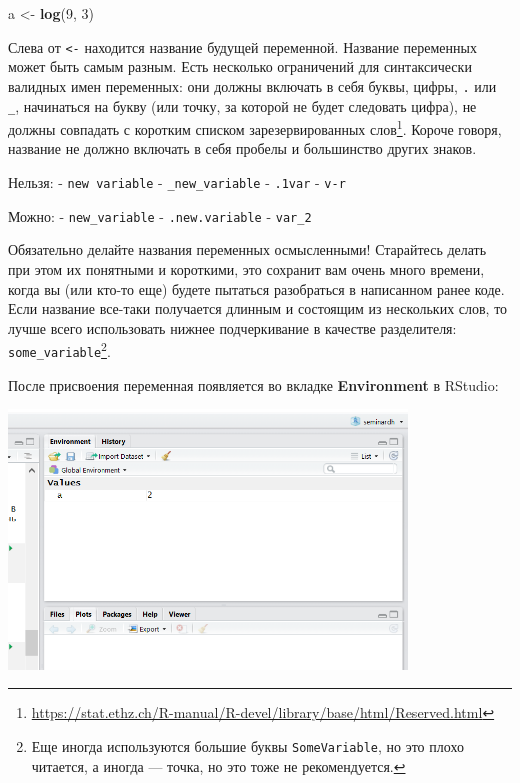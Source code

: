 \documentclass[
]{book}
\newenvironment{Shaded}{\begin{snugshade}}{\end{snugshade}}
\newcommand{\DecValTok}[1]{\textcolor[rgb]{0.00,0.00,0.81}{#1}}
\newcommand{\KeywordTok}[1]{\textcolor[rgb]{0.13,0.29,0.53}{\textbf{#1}}}
\newcommand{\NormalTok}[1]{#1}
\newcommand{\StringTok}[1]{\textcolor[rgb]{0.31,0.60,0.02}{#1}}
\renewcommand{\href}[2]{#2\footnote{\url{#1}}}
\begin{document}
\begin{Shaded}
\begin{Highlighting}[]
\NormalTok{a <-}\StringTok{ }\KeywordTok{log}\NormalTok{(}\DecValTok{9}\NormalTok{, }\DecValTok{3}\NormalTok{)}
\end{Highlighting}
\end{Shaded}

Слева от \texttt{\textless{}-} находится название будущей переменной. Название переменных может быть самым разным. Есть несколько ограничений для синтаксически валидных имен переменных: они должны включать в себя буквы, цифры, \texttt{.} или \texttt{\_}, начинаться на букву (или точку, за которой не будет следовать цифра), не должны совпадать с \href{https://stat.ethz.ch/R-manual/R-devel/library/base/html/Reserved.html}{коротким списком зарезервированных слов}. Короче говоря, название не должно включать в себя пробелы и большинство других знаков.

Нельзя:
- \texttt{new\ variable}
- \texttt{\_new\_variable}
- \texttt{.1var}
- \texttt{v-r}

Можно:
- \texttt{new\_variable}
- \texttt{.new.variable}
- \texttt{var\_2}

Обязательно делайте названия переменных осмысленными! Старайтесь делать при этом их понятными и короткими, это сохранит вам очень много времени, когда вы (или кто-то еще) будете пытаться разобраться в написанном ранее коде. Если название все-таки получается длинным и состоящим из нескольких слов, то лучше всего использовать нижнее подчеркивание в качестве разделителя: \texttt{some\_variable}\footnote{Еще иногда используются большие буквы \texttt{SomeVariable}, но это плохо читается, а иногда --- точка, но это тоже не рекомендуется.}.

После присвоения переменная появляется во вкладке \textbf{Environment} в RStudio:

\includegraphics[width=4.16667in,height=\textheight]{images/env.png}
\end{document}
